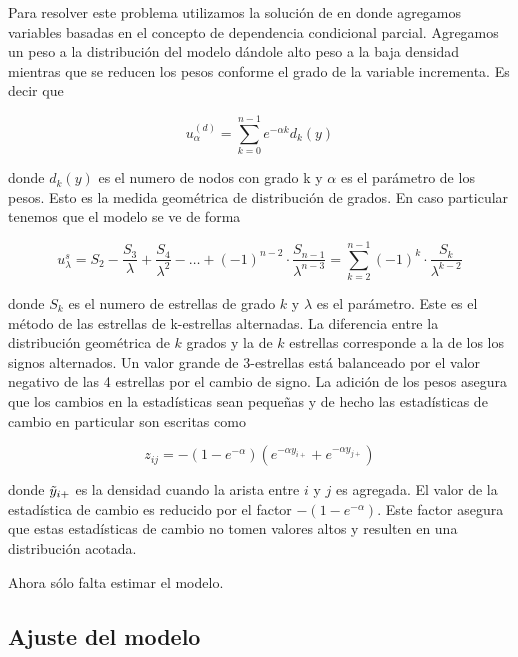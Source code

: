 Para resolver este problema utilizamos la solución de \cite{snijders_markov_2002} en donde agregamos variables basadas en el concepto de dependencia condicional parcial. Agregamos un peso a la distribución del modelo dándole alto peso a la baja densidad mientras que se reducen los pesos conforme el grado de la variable incrementa. Es decir que

\begin{equation*}
    u_{\alpha}^{(d)}=\sum_{k=0}^{n-1} e^{-\alpha k} d_{k}(y)
\end{equation*}

donde $d_k(y)$ es el numero de nodos con grado k y $\alpha$ es el parámetro de los pesos. Esto es la medida geométrica de distribución de grados. En caso particular tenemos que el modelo se ve de forma 

\begin{equation*}
    u_{\lambda}^{s}=S_{2}-\frac{S_{3}}{\lambda}+\frac{S_{4}}{\lambda^{2}}-\ldots+(-1)^{n-2} \cdot \frac{S_{n-1}}{\lambda^{n-3}}=\sum_{k=2}^{n-1}(-1)^{k} \cdot \frac{S_{k}}{\lambda^{k-2}}
\end{equation*}

donde $S_k$ es el numero de estrellas de grado $k$ y $\lambda$ es el parámetro. Este es el método de las estrellas de k-estrellas alternadas. La diferencia entre la distribución geométrica de $k$ grados y la de $k$ estrellas corresponde a la de los los signos alternados. Un valor grande de 3-estrellas está balanceado por el valor negativo de las 4 estrellas por el cambio de signo. La adición de los pesos asegura que los cambios en la estadísticas sean pequeñas y de hecho las estadísticas de cambio en particular son escritas como

\begin{equation*}
    z_{i j}=-\left(1-e^{-\alpha}\right)\left(e^{-\alpha y_{i+}}+e^{-\alpha y_{j+}}\right)
\end{equation*}

donde $\Tilde{y}_{i+}$ es la densidad cuando la arista entre $i$ y $j$ es agregada. El valor de la estadística de cambio es reducido por el factor $-(1-e^{-\alpha})$. Este factor asegura que estas estadísticas de cambio no tomen valores altos y resulten en una distribución acotada. 

Ahora sólo falta estimar el modelo.

\subsection{Ajuste del modelo}

